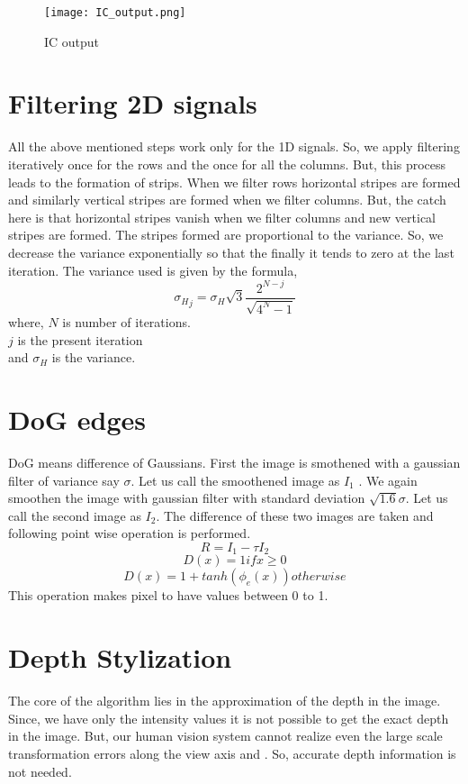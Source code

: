 \documentclass[conference]{IEEEtran}
\begin{document}
  \begin{figure}
 	\texttt{[image: IC\_output.png]}
 	\caption{IC output}
 \end{figure}
 
 \section{Filtering 2D signals}
 	All the above mentioned steps work only for the 1D signals. So, we apply filtering iteratively once for the rows and the once for all the columns. But, this process leads to the formation of strips. When we filter rows horizontal stripes are formed and similarly vertical stripes are formed when we filter columns. But, the catch here is that horizontal stripes vanish when we filter columns and new vertical stripes are formed. The stripes formed are proportional to the variance. So, we decrease the variance exponentially so that the finally it tends to zero at the last iteration. The variance used is given by the formula,
 	$${\sigma_H}_j = \sigma_H \sqrt{3} \frac{2^{N-j}}{\sqrt{4^N-1}}$$
 	where, $N$ is number of iterations.\\
 	$j$ is the present iteration\\
 	and $\sigma_H$ is the variance.
 	
 
 \section{DoG edges}
 	DoG means difference of Gaussians. First the image is smothened with a gaussian filter of variance say $\sigma$. Let us call the smoothened image as $I_1$ . We again smoothen the image with gaussian filter with standard deviation $\sqrt{1.6} \sigma$. Let us call the second image as $I_2$. The difference of these two images are taken and following  point wise operation is performed.
 	$$R = I_1 -  \tau I_2$$
 	$$D(x) = 1 if x \geq 0$$
 	$$D(x)  = 1 + tanh(\phi_e(x)) otherwise$$
 	This operation makes pixel to have values between 0 to 1.
 
 \section{Depth Stylization}
  The core of the algorithm lies in the approximation of the depth in the image. Since, we have only the intensity values it is not possible to get the exact depth in the image. But, our human vision system cannot realize even the large scale transformation errors along the view axis and . So, accurate depth information is not needed.
\end{document}

